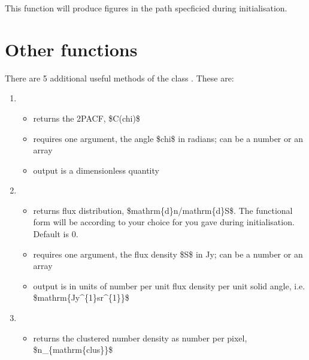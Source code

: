 \documentclass[letterpaper,10pt,english]{sphinxmanual}
\begin{document}
\sphinxAtStartPar
This function will produce figures in the path specficied during
initialisation.

\sphinxstepscope


\chapter{Other functions}
\label{\detokenize{otherfuncs:other-functions}}\label{\detokenize{otherfuncs::doc}}
\sphinxAtStartPar
There are 5 additional useful methods of the class . These are:\sphinxhyphen{}
\begin{enumerate}
%
\item {} 
\sphinxAtStartPar
{}
\begin{itemize}
\item {} 
\sphinxAtStartPar
returns the 2PACF, \$C(chi)\$

\item {} 
\sphinxAtStartPar
requires one argument, the angle \$chi\$ in radians; can be a
number or an array

\item {} 
\sphinxAtStartPar
output is a dimensionless quantity

\end{itemize}

\item {} 
\sphinxAtStartPar
{}
\begin{itemize}
\item {} 
\sphinxAtStartPar
returns flux distribution, \$mathrm\{d\}n/mathrm\{d\}S\$. The
functional form will be according to your choice for 
you gave during initialisation. Default is 0.

\item {} 
\sphinxAtStartPar
requires one argument, the flux density \$S\$ in Jy; can be a number
or an array

\item {} 
\sphinxAtStartPar
output is in units of number per unit flux density per unit solid
angle, i.e. \$mathrm\{Jy\textasciicircum{}\{\sphinxhyphen{}1\}sr\textasciicircum{}\{\sphinxhyphen{}1\}\}\$

\end{itemize}

\item {} 
\sphinxAtStartPar
{}
\begin{itemize}
\item {} 
\sphinxAtStartPar
returns the clustered number density as number per pixel,
\$n\_\{mathrm\{clus\}\}\$


\end{itemize}
\end{enumerate}
\end{document}
